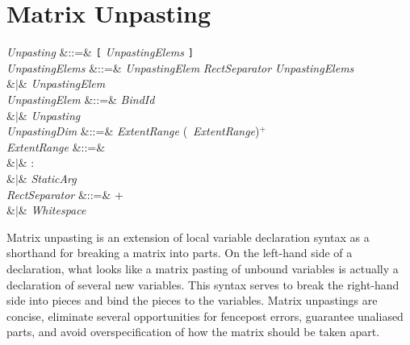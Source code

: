%
%
%
%

\section{Matrix Unpasting}



\begin{Grammar}
\emph{Unpasting} &::=& \texttt{[} \emph{UnpastingElems} \texttt{]} \\

\emph{UnpastingElems}
&::=& \emph{UnpastingElem} \emph{RectSeparator} \emph{UnpastingElems} \\
&$|$& \emph{UnpastingElem} \\

\emph{UnpastingElem}
&::=& \emph{BindId}  \\
&$|$& \emph{Unpasting} \\

\emph{UnpastingDim} &::=& \emph{ExtentRange} (\BY\ \emph{ExtentRange})$^+$ \\

\emph{ExtentRange}
&::=& 
\\
&$|$& \KWD:\\
&$|$& \emph{StaticArg} \\

\emph{RectSeparator} &::=& \EXP{;}+\\
&$|$& \emph{Whitespace}\\
\end{Grammar}

Matrix unpasting is an extension of local variable declaration syntax as a
shorthand for breaking a matrix into parts.  On the left-hand side of
a declaration, what looks like a matrix pasting of unbound variables
is actually a declaration of several new variables.
This syntax
serves to break the right-hand side into pieces and bind the pieces to
the variables.  Matrix unpastings are concise, eliminate several
opportunities for fencepost errors, guarantee unaliased parts, and
avoid overspecification of how the matrix should be taken apart.

